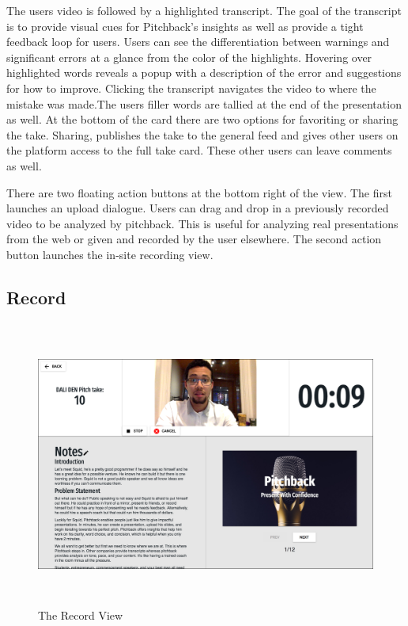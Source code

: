 The users video is followed by a highlighted transcript. The goal of the
transcript is to provide visual cues for Pitchback’s insights as well as provide
a tight feedback loop for users. Users can see the differentiation between
warnings and significant errors at a glance from the color of the highlights.
Hovering over highlighted words reveals a popup with a description of the error
and suggestions for how to improve. Clicking the transcript navigates the video
to where the mistake was made.The users filler words are tallied at the end of
the presentation as well. At the bottom of the card there are two options for
favoriting or sharing the take. Sharing, publishes the take to the general feed
and gives other users on the platform access to the full take card. These other
users can leave comments as well.

There are two floating action buttons at the bottom right of the view. The first
launches an upload dialogue. Users can drag and drop in a previously recorded
video to be analyzed by pitchback. This is useful for analyzing real
presentations from the web or given and recorded by the user elsewhere. The
second action button launches the in-site recording view.

\subsection*{Record}

\begin{figure}[H]
  \centering
   \includegraphics[height=3.7in]{figures/record}
   \caption{The Record View}
\end{figure}

